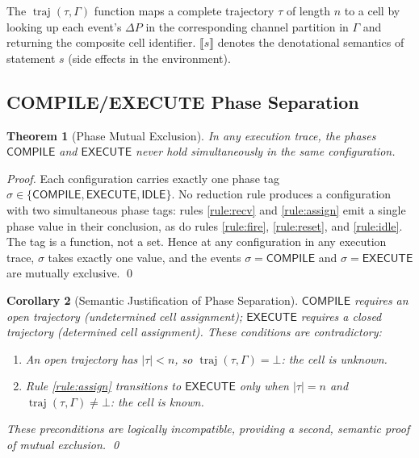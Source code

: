 \documentclass[twocolumn,10pt]{article}
\newtheorem{theorem}{Theorem}[section]
\newtheorem{corollary}[theorem]{Corollary}
\newcommand{\DP}{\Delta P}          %
\newcommand{\llb}{\llbracket}
\newcommand{\rrb}{\rrbracket}
\DeclareMathOperator{\traj}{traj}
\begin{document}
The $\traj(\tau, \Gamma)$ function maps a complete trajectory $\tau$
of length $n$ to a cell by looking up each event's $\DP$ in the
corresponding channel partition in $\Gamma$ and returning the
composite cell identifier. $\llb s \rrb$ denotes the denotational
semantics of statement $s$ (side effects in the environment).

\subsection{COMPILE/EXECUTE Phase Separation}

\begin{theorem}[Phase Mutual Exclusion]
\label{thm:phase}
In any execution trace, the phases $\mathsf{COMPILE}$ and
$\mathsf{EXECUTE}$ never hold simultaneously in the same
configuration.
\end{theorem}
\begin{proof}
Each configuration carries exactly one phase tag
$\sigma \in \{\mathsf{COMPILE}, \mathsf{EXECUTE}, \mathsf{IDLE}\}$.
No reduction rule produces a configuration with two simultaneous
phase tags: rules \eqref{rule:recv} and \eqref{rule:assign}
emit a single phase value in their conclusion, as do rules
\eqref{rule:fire}, \eqref{rule:reset}, and \eqref{rule:idle}.
The tag is a function, not a set. Hence at any configuration in any
execution trace, $\sigma$ takes exactly one value, and the events
$\sigma = \mathsf{COMPILE}$ and $\sigma = \mathsf{EXECUTE}$ are
mutually exclusive. \qed
\end{proof}

\begin{corollary}[Semantic Justification of Phase Separation]
\label{cor:phaselogic}
$\mathsf{COMPILE}$ requires an open trajectory (undetermined cell
assignment); $\mathsf{EXECUTE}$ requires a closed trajectory
(determined cell assignment). These conditions are contradictory:
\begin{enumerate}[leftmargin=1.5em,topsep=2pt,itemsep=1pt]
  \item[$\bullet$] An open trajectory has $|\tau| < n$, so
    $\traj(\tau, \Gamma) = \bot$: the cell is unknown.
  \item[$\bullet$] Rule \eqref{rule:assign} transitions to
    $\mathsf{EXECUTE}$ only when $|\tau| = n$ and
    $\traj(\tau, \Gamma) \neq \bot$: the cell is known.
\end{enumerate}
These preconditions are logically incompatible, providing a second,
semantic proof of mutual exclusion. \qed
\end{corollary}
\end{document}
